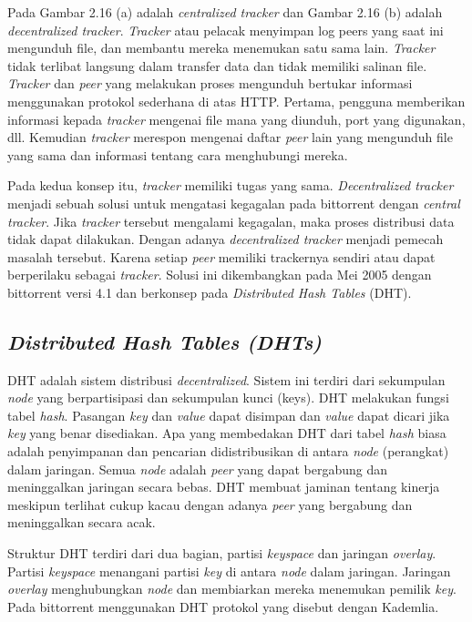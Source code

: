 Pada Gambar 2.16 (a) adalah \emph{centralized tracker} dan Gambar 2.16 (b) adalah \emph{decentralized tracker}. \emph{Tracker} atau pelacak menyimpan log peers yang saat ini mengunduh file, dan membantu mereka menemukan satu sama lain. \emph{Tracker} tidak terlibat langsung dalam transfer data dan tidak memiliki salinan file. \emph{Tracker} dan \emph{peer} yang melakukan proses mengunduh bertukar informasi menggunakan protokol sederhana di atas HTTP. Pertama, pengguna memberikan informasi kepada \emph{tracker} mengenai file mana yang diunduh, port yang digunakan, dll. Kemudian \emph{tracker} merespon mengenai daftar \emph{peer} lain yang mengunduh file yang sama dan informasi tentang cara menghubungi mereka.

Pada kedua konsep itu, \emph{tracker} memiliki tugas yang sama. \emph{Decentralized tracker} menjadi sebuah solusi untuk mengatasi kegagalan pada bittorrent dengan \emph{central tracker}. Jika \emph{tracker} tersebut mengalami kegagalan, maka proses distribusi data tidak dapat dilakukan. Dengan adanya \emph{decentralized tracker} menjadi pemecah masalah tersebut. Karena setiap \emph{peer} memiliki trackernya sendiri atau dapat berperilaku sebagai \emph{tracker}. Solusi ini dikembangkan pada Mei 2005 dengan bittorrent versi 4.1 dan berkonsep pada \emph{Distributed Hash Tables} (DHT).

\subsection{\emph{Distributed Hash Tables (DHTs)}}

DHT adalah sistem distribusi \emph{decentralized}. Sistem ini  terdiri dari sekumpulan \emph{node} yang berpartisipasi dan sekumpulan kunci (keys). DHT melakukan fungsi tabel \emph{hash}. Pasangan \emph{key} dan \emph{value} dapat disimpan dan \emph{value} dapat dicari jika \emph{key} yang benar disediakan. Apa yang membedakan DHT dari tabel \emph{hash} biasa adalah penyimpanan dan pencarian didistribusikan di antara \emph{node} (perangkat) dalam jaringan. Semua \emph{node} adalah \emph{peer} yang dapat bergabung dan meninggalkan jaringan secara bebas. DHT membuat jaminan tentang kinerja meskipun terlihat cukup kacau dengan adanya \emph{peer} yang bergabung dan meninggalkan secara acak.

Struktur DHT terdiri dari dua bagian, partisi \emph{keyspace} dan jaringan \emph{overlay}. Partisi \emph{keyspace} menangani partisi \emph{key} di antara \emph{node} dalam jaringan. Jaringan \emph{overlay} menghubungkan \emph{node} dan membiarkan mereka menemukan pemilik \emph{key}. Pada bittorrent menggunakan DHT protokol yang disebut dengan Kademlia.


